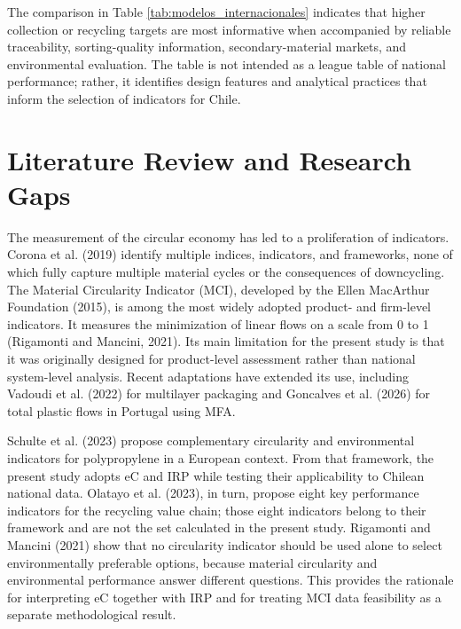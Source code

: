 \documentclass[review,10pt]{elsarticle}
\newcommand{\revpar}[1]{#1\par\medskip}
\DeclareRobustCommand{\change}[1]{#1}
\newcommand{\changepar}[1]{#1\par\medskip}
\begin{document}
\revpar{The comparison in Table \ref{tab:modelos_internacionales} indicates that higher collection or recycling targets are most informative when accompanied by reliable traceability, sorting-quality information, secondary-material markets, and environmental evaluation. The table is not intended as a league table of national performance; rather, it identifies design features and analytical practices that inform the selection of indicators for Chile.}

\section{Literature Review and Research Gaps}

\revpar{The measurement of the circular economy has led to a proliferation of indicators. \change{Corona et al. (2019)} identify multiple indices, indicators, and frameworks, none of which fully capture multiple material cycles or the consequences of downcycling. The Material Circularity Indicator (MCI), developed by the Ellen MacArthur Foundation (2015), is among the most widely adopted product- and firm-level indicators. It measures the minimization of linear flows on a scale from 0 to 1 (Rigamonti and Mancini, 2021). Its main limitation for the present study is that it was originally designed for product-level assessment rather than national system-level analysis. Recent adaptations have extended its use, including Vadoudi et al. (2022) for multilayer packaging and Goncalves et al. (2026) for total plastic flows in Portugal using MFA.}

\changepar{Schulte et al. (2023) propose complementary circularity and environmental indicators for polypropylene in a European context. From that framework, the present study adopts eC and IRP while testing their applicability to Chilean national data. Olatayo et al. (2023), in turn, propose eight key performance indicators for the recycling value chain; those eight indicators belong to their framework and are not the set calculated in the present study. Rigamonti and Mancini (2021) show that no circularity indicator should be used alone to select environmentally preferable options, because material circularity and environmental performance answer different questions. This provides the rationale for interpreting eC together with IRP and for treating MCI data feasibility as a separate methodological result.}
\end{document}
